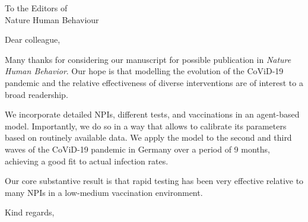 \documentclass[USenglish, 10pt, UBonn_letterhead]{scrlttr2}
\begin{document}


\begin{letter}{%
        To the Editors of\\
        Nature Human Behaviour \\
    }

    \opening{Dear colleague,}

    Many thanks for considering our manuscript for possible publication in
    \textit{Nature Human Behavior}. Our hope is that modelling the evolution of the
    CoViD-19 pandemic and the relative effectiveness of diverse interventions are of
    interest to a broad readership. 
    
    We incorporate detailed NPIs, different tests, and vaccinations in an agent-based
    model. Importantly, we do so in a way that allows to calibrate its parameters based
    on routinely available data. We apply the model to the second and third waves of the
    CoViD-19 pandemic in Germany over a period of 9 months, achieving a good fit to
    actual infection rates.
    
    Our core substantive result is that rapid testing has been very effective relative
    to many NPIs in a low-medium vaccination environment.

    \closing{Kind regards,}

\end{letter}
\end{document}

